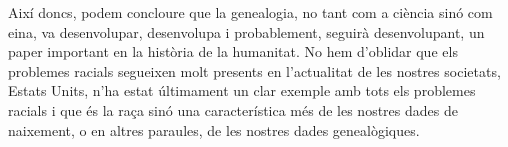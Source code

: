    Així doncs, podem concloure que la genealogia, no tant com a ciència sinó com eina, va desenvolupar, desenvolupa i probablement, seguirà desenvolupant, un paper important en la història de la humanitat. No hem d’oblidar que els problemes racials segueixen molt presents en l'actualitat de les nostres societats, Estats Units, n'ha estat últimament un clar exemple amb tots els problemes racials i que és la raça sinó una característica més de les nostres dades de naixement, o en altres paraules, de les nostres dades genealògiques.
